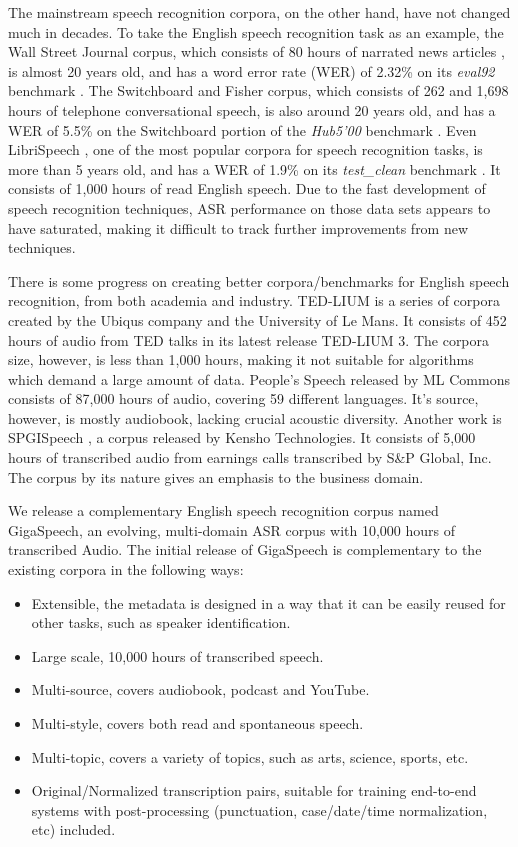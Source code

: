 \documentclass[a4paper]{article}
\begin{document}
The mainstream speech recognition corpora, on the other
hand, have not changed much in decades. To take the English speech recognition
task as an example, the Wall Street Journal corpus, which consists of 80 hours
of narrated news articles \cite{paul1992design}, is almost 20 years old, and has
a word error rate (WER) of 2.32\% on its {\it eval92} benchmark \cite{Povey2016Purely}.
The Switchboard and Fisher corpus, which consists of 262 and 1,698 hours of
telephone conversational speech, is also around 20 years old, and has a WER of
5.5\% on the Switchboard portion of the {\it Hub5'00} benchmark \cite{saon2017english}.
Even LibriSpeech \cite{panayotov2015librispeech}, one of the most popular corpora
for speech recognition tasks, is more than 5 years old, and has a WER of
1.9\% on its {\it test\_clean} benchmark \cite{gulati2020conformer}. It consists of
1,000 hours of read English speech. Due to the fast development of speech
recognition techniques, ASR performance on those data sets appears to have saturated,
making it difficult to track further improvements from new techniques.

There is some progress on creating better corpora/benchmarks for English speech
recognition, from both academia and industry. TED-LIUM \cite{hernandez2018ted} is a
series of corpora created by the Ubiqus company and the University of Le Mans.
It consists of 452 hours of audio from TED talks in its latest release
TED-LIUM 3. The corpora size, however, is less than 1,000 hours, making it not
suitable for algorithms which demand a large amount of data. People's Speech \cite{peoplespeech}
released by ML Commons consists of 87,000 hours of audio, covering 59
different languages. It's source, however, is mostly audiobook, lacking
crucial acoustic diversity. Another work is SPGISpeech \cite{oneill21},
a corpus released by Kensho Technologies. It consists of 5,000 hours of transcribed audio
from earnings calls transcribed by S\&P Global, Inc. The corpus by its nature
gives an emphasis to the business domain.

We release a complementary English speech recognition corpus named GigaSpeech,
an evolving, multi-domain ASR corpus with 10,000 hours of transcribed Audio.
The initial release of GigaSpeech is complementary to the existing corpora in
the following ways:
\begin{itemize}
  \item Extensible, the metadata is designed in a way that it can be easily reused
    for other tasks, such as speaker identification.
  \item Large scale, 10,000 hours of transcribed speech.
  \item Multi-source, covers audiobook, podcast and YouTube.
  \item Multi-style, covers both read and spontaneous speech.
  \item Multi-topic, covers a variety of topics, such as arts, science, sports, etc.
  \item Original/Normalized transcription pairs, suitable for training end-to-end
    systems with post-processing (punctuation, case/date/time normalization, etc) included.
\end{itemize}
\end{document}
